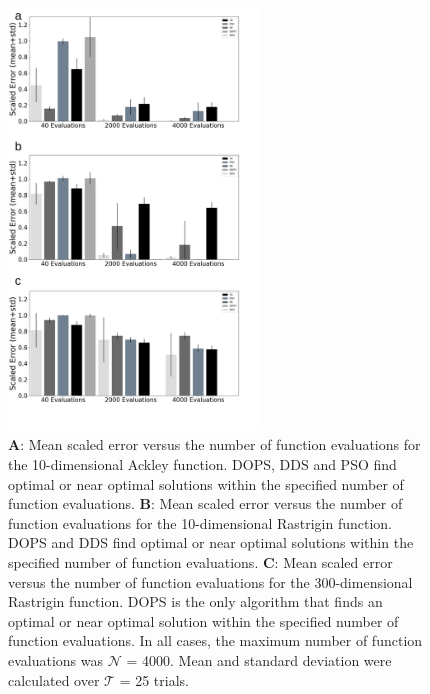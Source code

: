 \documentclass{bmcart}
\begin{document}
\begin{backmatter}
\clearpage

\begin{figure}[h!]
\centering
\includegraphics[width=0.60\textwidth]{./rachelfigs/fig2cropped.pdf}
\caption{
\textbf{A}: Mean scaled error versus the number of function evaluations for the 10-dimensional Ackley function. DOPS, DDS and PSO find optimal or near optimal solutions within the specified number of function evaluations.
\textbf{B}: Mean scaled error versus the number of function evaluations for the 10-dimensional Rastrigin function. DOPS and DDS find optimal or near optimal solutions within the specified number of function evaluations.
\textbf{C}: Mean scaled error versus the number of function evaluations for the 300-dimensional Rastrigin function. DOPS is the only algorithm that finds an optimal or near optimal solution within the specified number of function evaluations. In all cases, the maximum number of function evaluations was $\mathcal{N}$ = 4000. Mean and standard deviation were calculated over $\mathcal{T}$ = 25 trials. }\label{fig-testfunctions}
\end{figure}

\clearpage


\end{backmatter}
\end{document}
